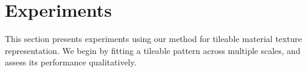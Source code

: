 
\section{Experiments}

This section presents experiments using our method for tileable material texture representation. We begin by fitting a tileable pattern across multiple scales, and assess its performance qualitatively. 

